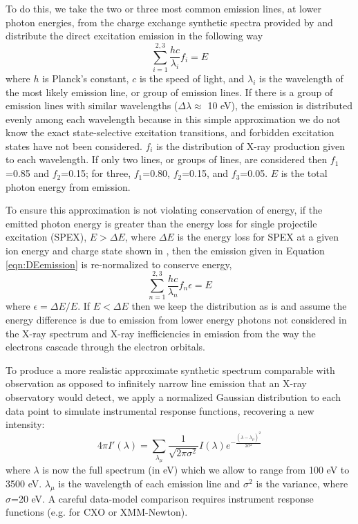 \documentclass[draft]{agujournal2018}
\begin{document}
To do this, we take the two or three most common emission lines, at lower photon energies, from the charge exchange synthetic spectra provided by \citet{hui2010} and distribute the direct excitation emission in the following way
\begin{equation}
    \sum_{i=1}^{2,3}\frac{hc}{\lambda_{i}}f_{i}=E
    \label{eqn:DEemission}
\end{equation}
where $h$ is Planck's constant, $c$ is the speed of light, and $\lambda_{i}$ is the wavelength of the most likely emission line, or group of emission lines.
If there is a group of emission lines with similar wavelengths ($\Delta\lambda\approx$ 10 eV), the emission is distributed evenly among each wavelength because in this simple approximation we do not know the exact state-selective excitation transitions, and forbidden excitation states have not been considered.
$f_{i}$ is the distribution of X-ray production given to each wavelength.
If only two lines, or groups of lines, are considered then $f_{1}$=0.85 and $f_{2}$=0.15; for three, $f_{1}$=0.80, $f_{2}$=0.15, and $f_{3}$=0.05.
$E$ is the total photon energy from emission.

To ensure this approximation is not violating conservation of energy, if the emitted photon energy is greater than the energy loss for single projectile excitation (SPEX), $E>\Delta E$, where $\Delta E$ is the energy loss for SPEX at a given ion energy and charge state shown in \citet{schultz2019}, then the emission given in Equation \ref{eqn:DEemission} is re-normalized to conserve energy,
\begin{equation}
    \sum_{n=1}^{2,3}\frac{hc}{\lambda_{n}}f_{n}\epsilon=E
\end{equation}
where $\epsilon=\Delta E/E$.
If $E<\Delta E$ then we keep the distribution as is and assume the energy difference is due to emission from lower energy photons not considered in the X-ray spectrum and X-ray inefficiencies in emission from the way the electrons cascade through the electron orbitals.

To produce a more realistic approximate synthetic spectrum comparable with observation as opposed to infinitely narrow line emission that an X-ray observatory would detect, we apply a normalized Gaussian distribution to each data point to simulate instrumental response functions, recovering a new intensity:
\begin{equation}
    4\pi I'(\lambda)=\sum_{\lambda_{\mu}}\frac{1}{\sqrt{2\pi\sigma^2}}I(\lambda)e^{-\frac{(\lambda-\lambda_{\mu})^2}{2\sigma^2}}
\end{equation}
where $\lambda$ is now the full spectrum (in eV) which we allow to range from 100 eV to 3500 eV.
$\lambda_{\mu}$ is the wavelength of each emission line and $\sigma^2$ is the variance, where $\sigma$=20 eV.
A careful data-model comparison requires instrument response functions (e.g. for CXO or XMM-Newton).
\end{document}
